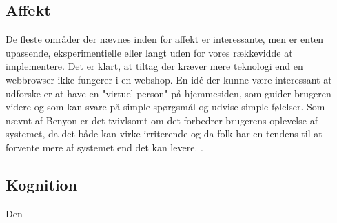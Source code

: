 \subsection{Affekt}
De fleste områder der nævnes inden for affekt er interessante, men er enten upassende, eksperimentielle eller langt uden for vores rækkevidde at
implementere. Det er klart, at tiltag der kræver mere teknologi end en webbrowser ikke fungerer i en webshop. En idé der kunne være interessant
at udforske er at have en "virtuel person" på hjemmesiden, som guider brugeren videre og som kan svare på simple spørgsmål og udvise simple følelser.
Som nævnt af Benyon er det tvivlsomt om det forbedrer brugerens oplevelse af systemet, da det både kan virke irriterende og da folk har en tendens
til at forvente mere af systemet end det kan levere. \cite[s. 571]{Benyon2010}.

\subsection{Kognition}
Den 


